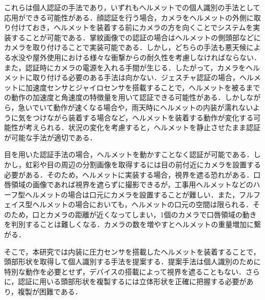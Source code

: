 \documentclass[Japanese,noauthor]{dicomopapers}
\begin{document}
これらは個人認証の手法であり，いずれもヘルメットでの個人識別の手法として応用ができる可能性がある．顔認証を行う場合，カメラをヘルメットの外側に取り付けておき，ヘルメットを装着する前にカメラの方を向くことでシステムを実装することが可能である．掌紋画像での認証の場合はヘルメットの側頭部などにカメラを取り付けることで実装可能である．しかし，どちらの手法も悪天候による水没や屋外使用における様々な衝撃からの耐久性を考慮しなければならない．また，認証時にカメラの電源を入れる手間が生じる．したがって，カメラをヘルメットに取り付ける必要のある手法は向かない．ジェスチャ認証の場合，ヘルメットに加速度センサとジャイロセンサを搭載することで，ヘルメットを被るまでの動作の加速度と角速度の特徴量を用いて認証できる可能性がある．しかしながら，急いでいて動作が速くなる場合や，雨天時にヘルメットの内装が濡れないように気をつけながら装着する場合など，ヘルメットを装着する動作が変化する可能性が考えられる．状況の変化を考慮すると，ヘルメットを静止させたまま認証が可能な手法が適切である．\par

目を用いた認証手法の場合，ヘルメットを動かすことなく認証が可能である．しかし，虹彩や目の周辺の分割画像を取得するには目の前付近にカメラを設置する必要がある．そのため，ヘルメットに実装する場合，視界を遮る恐れがある．口唇領域の画像であれば視界を遮らずに撮影できるが，工事用ヘルメットなどのハーフ型ヘルメットの場合は口元にカメラを設置することが難しい．また，フルフェイス型ヘルメットの場合においても，ヘルメットの口元の空間は限られる．そのため，口とカメラの距離が近くなってしまい，1個のカメラで口唇領域の動きを判別することは難しくなる．カメラの数を増やすとヘルメットの重量増加に繋がる．\par

そこで，本研究では内装に圧力センサを搭載したヘルメットを装着することで，頭部形状を取得して個人識別する手法を提案する．提案手法は個人識別のために特別な動作を必要とせず，デバイスの搭載によって視界を遮ることもない．さらに，認証に用いる頭部形状を複製するには立体形状を正確に把握する必要があり，複製が困難である．
\end{document}
